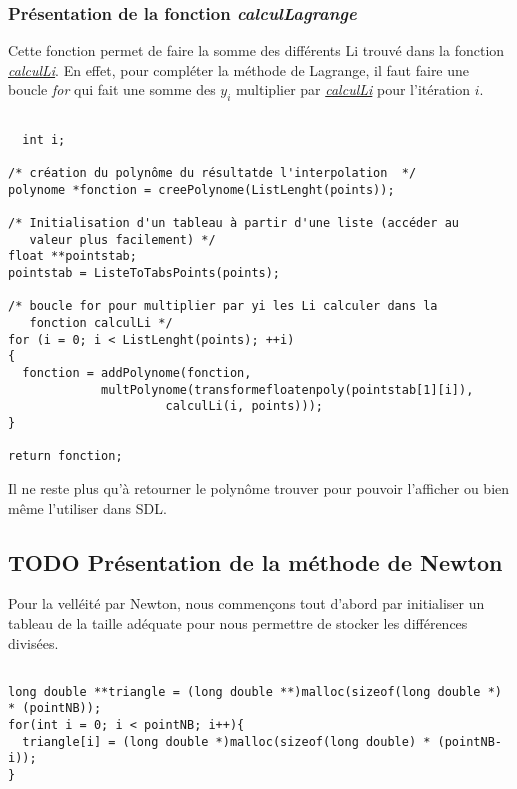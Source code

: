 \documentclass[letter]{article}
\begin{document}
\subsubsection{Présentation de la fonction \emph{calculLagrange}}
\label{sec:org2b37126}

Cette fonction permet de faire la somme des différents Li trouvé dans la fonction \hyperref[sec:orga976c24]{\emph{calculLi}}.
En effet, pour compléter la méthode de Lagrange, il faut faire une boucle \emph{for} qui fait une somme des \(y_i\) multiplier par \hyperref[sec:orga976c24]{\emph{calculLi}} pour l'itération \(i\).

\begin{verbatim}

  int i;

/* création du polynôme du résultatde l'interpolation  */
polynome *fonction = creePolynome(ListLenght(points));

/* Initialisation d'un tableau à partir d'une liste (accéder au
   valeur plus facilement) */
float **pointstab;
pointstab = ListeToTabsPoints(points);

/* boucle for pour multiplier par yi les Li calculer dans la
   fonction calculLi */
for (i = 0; i < ListLenght(points); ++i)
{
  fonction = addPolynome(fonction,
			 multPolynome(transformefloatenpoly(pointstab[1][i]),
				      calculLi(i, points)));
}

return fonction;

\end{verbatim}

Il ne reste plus qu'à retourner le polynôme trouver pour pouvoir l'afficher ou bien même l'utiliser dans SDL.

\subsection{{\bfseries\sffamily TODO} Présentation de la méthode de Newton}
\label{sec:orgdefabdd}





Pour la velléité par Newton, nous commençons tout d'abord par initialiser un tableau de la taille adéquate pour nous permettre de stocker les différences divisées.

\begin{verbatim}

long double **triangle = (long double **)malloc(sizeof(long double *) * (pointNB));
for(int i = 0; i < pointNB; i++){
  triangle[i] = (long double *)malloc(sizeof(long double) * (pointNB-i));
}


\end{verbatim}
\end{document}
